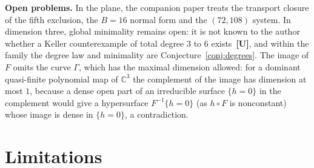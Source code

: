 \documentclass[11pt]{article}
\theoremstyle{definition}
\theoremstyle{remark}
\newcommand{\C}{\mathbb{C}}
\newcommand{\UU}{\textbf{[U]}}
\begin{document}
\textbf{Open problems.} In the plane, the companion paper \cite{SLplanar} treats the transport closure of the fifth exclusion, the $B = 16$ normal form and the $(72,108)$ system. In dimension three, global minimality remains open: it is not known to the author whether a Keller counterexample of total degree $3$ to $6$ exists~\UU{}, and within the family the degree law and minimality are Conjecture~\ref{conj:degrees}. The image of $F$ omits the curve $\Gamma$, which has the maximal dimension allowed: for a dominant quasi-finite polynomial map of $\C^3$ the complement of the image has dimension at most $1$, because a dense open part of an irreducible surface $\{h = 0\}$ in the complement would give a hypersurface $F^{-1}\{h = 0\}$ (as $h \circ F$ is nonconstant) whose image is dense in $\{h = 0\}$, a contradiction.

\section{Limitations}\label{sec:limitations}
\end{document}
